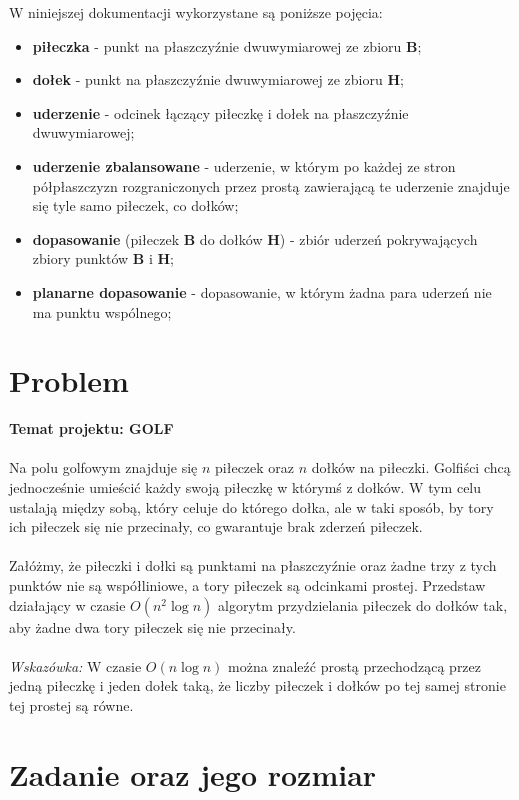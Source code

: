\documentclass[10pt,a4paper]{article}
\begin{document}
	W niniejszej dokumentacji wykorzystane są poniższe pojęcia:
	\begin{itemize}
		\item \textbf{piłeczka} - punkt na płaszczyźnie dwuwymiarowej ze zbioru $\mathbf{B}$;
		\item \textbf{dołek} - punkt na płaszczyźnie dwuwymiarowej ze zbioru $\mathbf{H}$;
		\item \textbf{uderzenie} - odcinek łączący piłeczkę i dołek na płaszczyźnie dwuwymiarowej;
		\item \textbf{uderzenie zbalansowane} - uderzenie, w którym po każdej ze stron półpłaszczyzn rozgraniczonych przez prostą zawierającą te uderzenie znajduje się tyle samo piłeczek, co dołków;
		\item \textbf{dopasowanie} (piłeczek $\mathbf{B}$ do dołków $\mathbf{H}$) - zbiór uderzeń pokrywających zbiory punktów $\mathbf{B}$ i $\mathbf{H}$;
		\item \textbf{planarne dopasowanie} - dopasowanie, w którym żadna para uderzeń nie ma punktu wspólnego;
	\end{itemize}
	
	\section{Problem}
	
	\textbf{Temat projektu: GOLF} \\~\\
	Na polu golfowym znajduje się $n$ piłeczek oraz $n$ dołków na piłeczki. Golfiści chcą jednocześnie umieścić każdy swoją piłeczkę w którymś z dołków. W tym celu ustalają między sobą, który celuje do którego dołka, ale w taki sposób, by tory ich	piłeczek się nie przecinały, co gwarantuje brak zderzeń piłeczek.\\~\\ 
	Załóżmy, że piłeczki i dołki są punktami na płaszczyźnie oraz żadne trzy z tych punktów nie są współliniowe, a tory piłeczek są odcinkami prostej. Przedstaw działający w czasie $O(n^2\log n)$ algorytm przydzielania piłeczek do dołków tak, aby żadne dwa tory piłeczek się nie przecinały.\\~\\
	\textit{Wskazówka:} W czasie $O(n\log n)$ można znaleźć prostą przechodzącą przez jedną piłeczkę i jeden dołek taką, że liczby piłeczek i dołków po tej samej stronie tej prostej są równe.
	
	\section{Zadanie oraz jego rozmiar}
	
\end{document}

